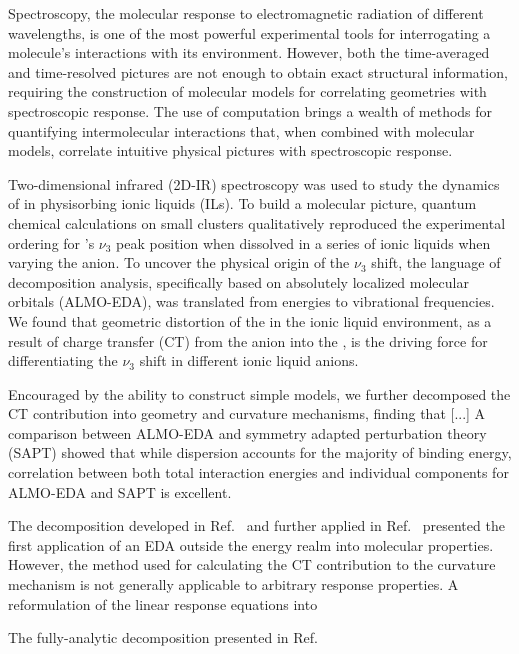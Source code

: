 \documentclass[%
  class = article,%
  crop = false,%
  float = true,%
  multi = true,%
  preview = false,%
]{standalone}
\begin{document}
Spectroscopy, the molecular response to electromagnetic radiation of different wavelengths, is one of the most powerful experimental tools for interrogating a molecule's interactions with its environment. However, both the time-averaged and time-resolved pictures are not enough to obtain exact structural information, requiring the construction of molecular models for correlating geometries with spectroscopic response. The use of computation brings a wealth of methods for quantifying intermolecular interactions that, when combined with molecular models, correlate intuitive physical pictures with spectroscopic response.

Two-dimensional infrared (2D-IR) spectroscopy was used to study the dynamics of  in physisorbing ionic liquids (ILs). To build a molecular picture, quantum chemical calculations on small clusters qualitatively reproduced the experimental ordering for 's \(\nu_3\) peak position when dissolved in a series of ionic liquids when varying the anion. To uncover the physical origin of the \(\nu_3\) shift, the language of decomposition analysis, specifically based on absolutely localized molecular orbitals (ALMO-EDA), was translated from energies to vibrational frequencies. We found that geometric distortion of the  in the ionic liquid environment, as a result of charge transfer (CT) from the anion into the , is the driving force for differentiating the  \(\nu_3\) shift in different ionic liquid anions.

Encouraged by the ability to construct simple models, we further decomposed the CT contribution into geometry and curvature mechanisms, finding that [...] A comparison between ALMO-EDA and symmetry adapted perturbation theory (SAPT) showed that while dispersion accounts for the majority of binding energy, correlation between both total interaction energies and individual components for ALMO-EDA and SAPT is excellent.

The decomposition developed in Ref.~\parencite{Brinzer2015} and further applied in Ref.~\parencite{Berquist2017} presented the first application of an EDA outside the energy realm into molecular properties. However, the method used for calculating the CT contribution to the curvature mechanism is not generally applicable to arbitrary response properties. A reformulation of the linear response equations into

The fully-analytic decomposition presented in Ref.~\parencite{Berquist2018}
\end{document}
